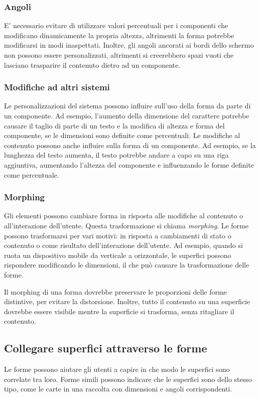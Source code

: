 \documentclass[12pt, a4paper]{report}
\begin{document}
	\subsubsection{Angoli}
	E' necessario evitare di utilizzare valori percentuali per i componenti che modificano dinamicamente la propria altezza, altrimenti la forma potrebbe modificarsi in modi inaspettati.
	Inoltre, gli angoli ancorati ai bordi dello schermo non possono essere personalizzati, altrimenti si creerebbero spazi vuoti che lasciano trasparire il contenuto dietro ad un componente.

	\subsubsection{Modifiche ad altri sistemi}
	Le personalizzazioni del sistema possono influire sull'uso della forma da parte di un componente. Ad esempio, l'aumento della dimensione del carattere potrebbe causare il taglio di parte di un testo e la modifica di altezza e forma del componente, se le dimensioni sono definite come percentuali.
	Le modifiche al contenuto possono anche influire sulla forma di un componente. Ad esempio, se la lunghezza del testo aumenta, il testo potrebbe andare a capo su una riga aggiuntiva, aumentando l'altezza del componente e influenzando le forme definite come percentuale.

	\subsubsection{Morphing}
	Gli elementi possono cambiare forma in risposta alle modifiche al contenuto o all'interazione dell'utente. Questa trasformazione si chiama \textit{morphing}. Le forme possono trasformarsi per vari motivi: in risposta a cambiamenti di stato o contenuto o come risultato dell'interazione dell'utente. Ad esempio, quando si ruota un
	dispositivo mobile da verticale a orizzontale, le superfici possono rispondere modificando le dimensioni, il che può causare la trasformazione delle forme.

	Il morphing di una forma dovrebbe preservare le proporzioni delle forme distintive, per evitare la distorsione.
	Inoltre, tutto il contenuto su una superficie dovrebbe essere visibile mentre la superficie si trasforma, senza ritagliare il contenuto.

	\subsection{Collegare superfici attraverso le forme}
	Le forme possono aiutare gli utenti a capire in che modo le superfici sono correlate tra loro.
	Forme simili possono indicare che le superfici sono dello stesso tipo, come le carte in una raccolta con dimensioni e angoli corrispondenti.
\end{document}
